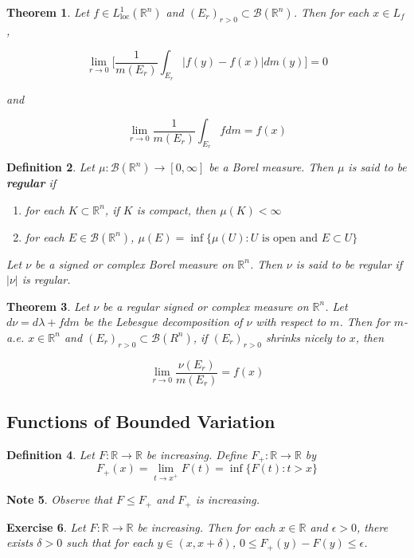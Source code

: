 \documentclass[12pt]{amsart}
\newtheorem{thm}{Theorem}[subsection]
\newtheorem{defn}[thm]{Definition}
\newtheorem{note}[thm]{Note}
\newtheorem{ex}[thm]{Exercise}
\newcommand{\del}{\delta}
\newcommand{\lam}{\lambda}
\newcommand{\ep}{\epsilon}
\newcommand{\R}{\mathbb{R}}
\newcommand{\MB}{\mathcal{B}}
\newcommand{\RG}{[0,\infty]}
\newcommand{\Ll}{L^1_{\text{loc}}(\R^n)}
\begin{document}
\begin{thm}
	Let $f \in \Ll$ and $(E_r)_{r>0} \subset \MB(\R^n)$. Then for each $x \in L_f$, 
	
	$$\lim_{r \rightarrow 0} \bigg[ \frac{1}{m(E_r)}\int_{E_r}|f(y) - f(x)|dm(y)\bigg] =0$$
	
	and 
	
	$$\lim_{r \rightarrow 0}  \frac{1}{m(E_r)}\int_{E_r}fdm = f(x)$$
\end{thm}

\begin{defn}
	Let $\mu:\MB(\R^n) \rightarrow \RG$ be a Borel measure. Then $\mu$ is said to be \textbf{regular} if 
	\begin{enumerate}
		\item for each $K \subset \R^n$, if $K$ is compact, then $\mu(K)< \infty$
		\item for each $E \in \MB(\R^n)$, $\mu(E) = \inf \{\mu(U): U \text{ is open and }E \subset U\}$
	\end{enumerate}
	
	Let $\nu$ be a signed or complex Borel measure on $\R^n$. Then $\nu$ is said to be regular if $|\nu|$ is regular.
\end{defn}

\begin{thm}
	Let $\nu$ be a regular signed or complex measure on $\R^n$. Let $d\nu = d\lam + f dm$ be the Lebesgue decomposition of $\nu$ with respect to $m$. Then for $m$-a.e. $x \in \R^n$ and $(E_r)_{r >0} \subset \MB(R^n)$, if $(E_r)_{r >0}$ shrinks nicely to $x$, then 
	
	$$\lim_{r \rightarrow 0} \frac{\nu(E_r)}{m(E_r)} = f(x)$$
\end{thm}

\subsection{Functions of Bounded Variation}

\begin{defn}
	Let $F:\R \rightarrow \R$ be increasing. Define $F_+:\R \rightarrow \R$ by $$F_+(x) = \lim_{t \rightarrow x^+}F(t) = \inf \{F(t): t>x \}$$
\end{defn}

\begin{note}
	Observe that $F \leq F_+$ and $F_+$ is increasing.
\end{note}

\begin{ex}
	Let $F:\R \rightarrow \R$ be increasing. Then for each $x \in \R$ and $ \ep>0$, there exists $\del >0$ such that for each $y \in (x,x+\del)$, $0 \leq F_+(y) - F(y) \leq \ep$.
\end{ex}
\end{document}
